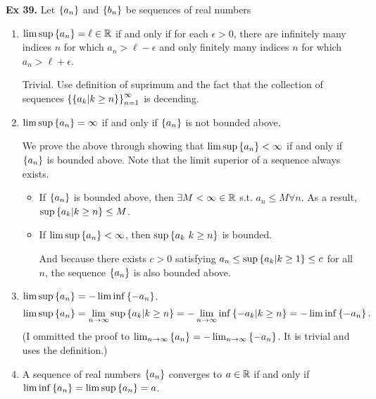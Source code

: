 \noindent {} \textbf{Ex 39.} \label{ex:39}
Let $\left\{a_n\right\}$ and $\left\{b_n\right\}$ be sequences of real numbers
\begin{enumerate}[label=(\roman*)]
    \item $\limsup\left\{a_n\right\} = \ell \in \mathbb{R}$ if and only if for each $\epsilon > 0$, there are infinitely many indices $n$ for which $a_n > \ell - \epsilon$ and only finitely many indices $n$ for which $a_n > \ell + \epsilon$.
    
    Trivial. Use definition of suprimum and the fact that the collection of sequences $\left\{\left\{a_k | k \geq n\right\}\right\}_{n=1}^\infty$ is decending.

    \item $\limsup\left\{a_n\right\} = \infty$ if and only if $\left\{a_n\right\}$ is not bounded above.
    
    We prove the above through showing that $\limsup\left\{a_n\right\} < \infty$ if and only if $\left\{a_n\right\}$ is bounded above. Note that the limit superior of a sequence always exists.
    \begin{itemize}
        \item If $\left\{a_n\right\}$ is bounded above, then $\exists M < \infty \in \mathbb{R}$ s.t. $a_n \leq M \forall n$.
        As a result, $\sup\left\{a_k | k \geq n\right\} \leq M$.
        \item If $\limsup\left\{a_n\right\} < \infty$, then $\sup\left\{a_k \ k \geq n\right\}$ is bounded.
        
        And because there exists $c > 0$ satisfying $a_n \leq \sup\left\{a_k | k \geq 1\right\} \leq c$ for all $n$, the sequence $\left\{a_n\right\}$ is also bounded above.
    \end{itemize}

    \item $\limsup\left\{a_n\right\} = -\liminf\left\{-a_n\right\}$.
    \[\limsup\left\{a_n\right\} = \lim_{n\to\infty}\sup\left\{a_k | k \geq n\right\} = -\lim_{n\to\infty}\inf\left\{-a_k | k \geq n\right\} = -\liminf\left\{-a_n\right\}.\]
    (I ommitted the proof to $\lim_{n\to\infty}\left\{a_n\right\} = -\lim_{n\to\infty}\left\{-a_n\right\}$. It is trivial and uses the definition.)

    \item A sequence of real numbers $\left\{a_n\right\}$ converges to $a \in \mathbb{R}$ if and only if $\liminf\left\{a_n\right\} = \limsup\left\{a_n\right\} = a$.
    

\end{enumerate}
